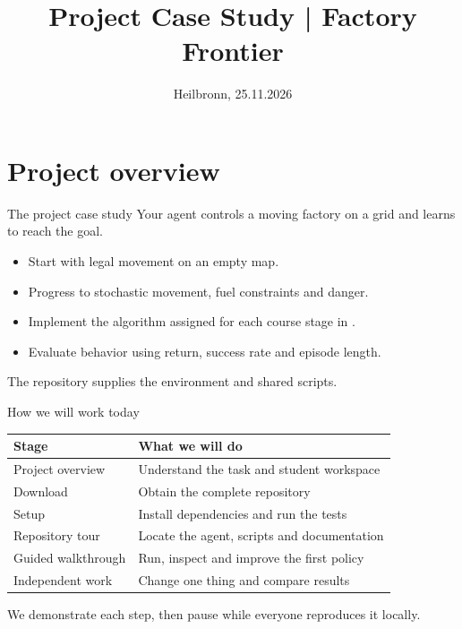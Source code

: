 \documentclass[english,aspectratio=169,sectionpage=false]{tumbeamer}
\title{Project Case Study | Factory Frontier}
\subtitle{}
\author{}
\institute{Technical University of Munich\\[1.8mm]
  TUM School of Management\\[1.8mm]
  Chair of Business Analytics}
\date{Heilbronn, 25.11.2026}
\newcommand{\file}[1]{\texttt{\detokenize{#1}}}
\begin{document}
\maketitle

\section{Project overview}
\begin{frame}{The project case study}
  Your agent controls a moving factory on a grid and learns to reach the goal.
  \begin{itemize}
    \item Start with legal movement on an empty map.
    \item Progress to stochastic movement, fuel constraints and danger.
    \item Implement the algorithm assigned for each course stage in \file{student/}.
    \item Evaluate behavior using return, success rate and episode length.
  \end{itemize}
  \medskip
  The repository supplies the environment and shared scripts.\par
\end{frame}

\begin{frame}{How we will work today}
  \begin{tabular}{@{}p{}p{}@{}}
    \toprule
    \textbf{Stage} & \textbf{What we will do} \\
    \midrule
    Project overview & Understand the task and student workspace \\[0.7em]
    Download & Obtain the complete repository \\[0.7em]
    Setup & Install dependencies and run the tests \\[0.7em]
    Repository tour & Locate the agent, scripts and documentation \\[0.7em]
    Guided walkthrough & Run, inspect and improve the first policy \\[0.7em]
    Independent work & Change one thing and compare results \\
    \bottomrule
  \end{tabular}
  \par\medskip
  We demonstrate each step, then pause while everyone reproduces it locally.
\end{frame}
\end{document}
